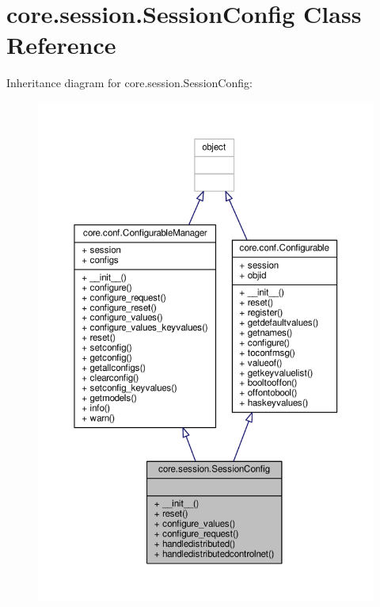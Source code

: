 \hypertarget{classcore_1_1session_1_1_session_config}{\section{core.\+session.\+Session\+Config Class Reference}
\label{classcore_1_1session_1_1_session_config}
}


Inheritance diagram for core.\+session.\+Session\+Config\+:
\nopagebreak
\begin{figure}[H]
\begin{center}
\leavevmode
\includegraphics[width=350pt]{classcore_1_1session_1_1_session_config__inherit__graph}
\end{center}
\end{figure}


